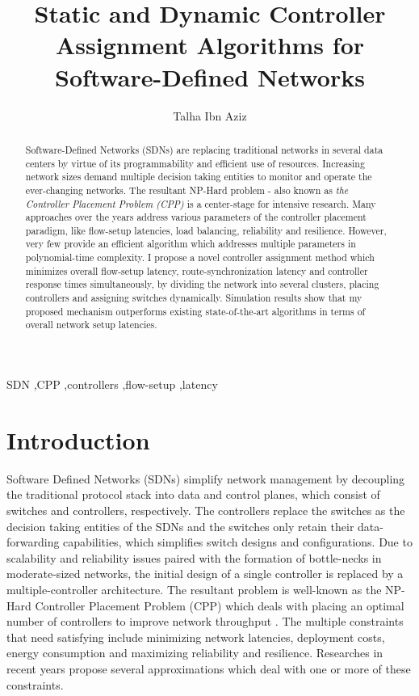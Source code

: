 \documentclass[preprint,12pt]{elsarticle}
\begin{document}
	\begin{frontmatter}
		\title{Static and Dynamic Controller Assignment Algorithms for Software-Defined Networks}
		
		\author{Talha Ibn Aziz}
		\address{Department of Computer Science and Engineering, Islamic University of Technology, Dhaka, Bangladesh, Email: talhaibnaziz@iut-dhaka.edu}
		
		\begin{abstract}
			Software-Defined Networks (SDNs) are replacing traditional networks in several data centers by virtue of its programmability and efficient use of resources. Increasing network sizes demand multiple decision taking entities to monitor and operate the ever-changing networks. The resultant NP-Hard problem - also known as \textit{the Controller Placement Problem (CPP)} is a center-stage for intensive research. Many approaches over the years address various parameters of the controller placement paradigm, like flow-setup latencies, load balancing, reliability and resilience. However, very few provide an efficient algorithm which addresses multiple parameters in polynomial-time complexity. I propose a novel controller assignment method which minimizes overall flow-setup latency, route-synchronization latency and controller response times simultaneously, by dividing the network into several clusters, placing controllers and assigning switches dynamically. Simulation results show that my proposed mechanism outperforms existing state-of-the-art algorithms in terms of overall network setup latencies.
		\end{abstract}
		\begin{keyword}
			SDN \sep CPP \sep controllers \sep flow-setup \sep latency
		\end{keyword}
		
	\end{frontmatter}

	\section{Introduction}
	Software Defined Networks (SDNs) simplify network management by decoupling the traditional protocol stack into data and control planes, which consist of switches and controllers, respectively. The controllers replace the switches as the decision taking entities of the SDNs and the switches only retain their data-forwarding capabilities, which simplifies switch designs and configurations. Due to scalability and reliability issues \cite{scalability2013dixit, scalability2013yeganeh} paired with the formation of bottle-necks in moderate-sized networks, the initial design of a single controller \cite{greene2009tr10} is replaced by a multiple-controller architecture. The resultant problem is well-known as the NP-Hard Controller Placement Problem (CPP) which deals with placing an optimal number of controllers to improve network throughput \cite{cppsurvey2017, cppsurvey2018, sdnsurvey2017}. The multiple constraints that need satisfying include minimizing network latencies, deployment costs, energy consumption and maximizing reliability and resilience. Researches in recent years propose several approximations which deal with one or more of these constraints.
	
\end{document}
